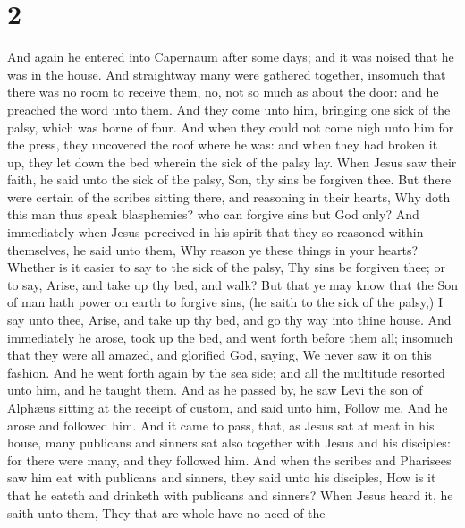 \hypertarget{section-1}{%
\section{2}\label{section-1}}

 And again he entered into Capernaum after some days; and
it was noised that he was in the house.  And straightway
many were gathered together, insomuch that there was no room to receive
them, no, not so much as about the door: and he preached the word unto
them.  And they come unto him, bringing one sick of the
palsy, which was borne of four.  And when they could not
come nigh unto him for the press, they uncovered the roof where he was:
and when they had broken it up, they let down the bed wherein the sick
of the palsy lay.  When Jesus saw their faith, he said
unto the sick of the palsy, Son, thy sins be forgiven thee.
 But there were certain of the scribes sitting there, and
reasoning in their hearts,  Why doth this man thus speak
blasphemies? who can forgive sins but God only?  And
immediately when Jesus perceived in his spirit that they so reasoned
within themselves, he said unto them, Why reason ye these things in your
hearts?  Whether is it easier to say to the sick of the
palsy, Thy sins be forgiven thee; or to say, Arise, and take up thy bed,
and walk?  But that ye may know that the Son of man hath
power on earth to forgive sins, (he saith to the sick of the palsy,)
 I say unto thee, Arise, and take up thy bed, and go thy
way into thine house.  And immediately he arose, took up
the bed, and went forth before them all; insomuch that they were all
amazed, and glorified God, saying, We never saw it on this fashion.
 And he went forth again by the sea side; and all the
multitude resorted unto him, and he taught them.  And as
he passed by, he saw Levi the son of Alphæus sitting at the receipt of
custom, and said unto him, Follow me. And he arose and followed him.
 And it came to pass, that, as Jesus sat at meat in his
house, many publicans and sinners sat also together with Jesus and his
disciples: for there were many, and they followed him. 
And when the scribes and Pharisees saw him eat with publicans and
sinners, they said unto his disciples, How is it that he eateth and
drinketh with publicans and sinners?  When Jesus heard
it, he saith unto them, They that are whole have no need of the
